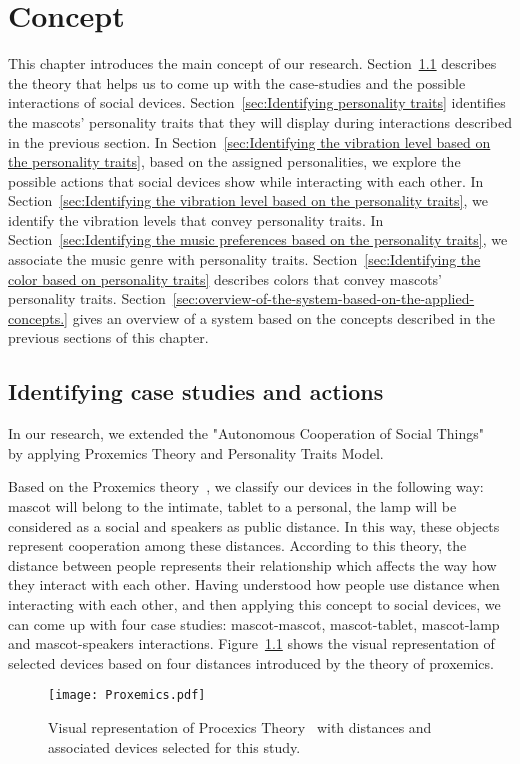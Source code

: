 \chapter{Concept}
\label{ch:concept}

This chapter introduces the main concept of our research.
Section~\ref{sec:Identifying case studies and actions} describes the theory that helps us
to come up with the case-studies and the possible interactions of social devices.
Section~\ref{sec:Identifying personality traits} identifies the mascots' personality traits
that they will display during interactions described in the previous section.
In Section~\ref{sec:Identifying the vibration level based on the personality traits},
based on the assigned personalities, we explore the possible actions
that social devices show while interacting with each other.
In Section~\ref{sec:Identifying the vibration level based on the personality traits},
we identify the vibration levels that convey personality traits.
In Section~\ref{sec:Identifying the music preferences based on the personality traits},
we associate the music genre with personality traits.
Section~\ref{sec:Identifying the color based on personality traits} describes
colors that convey mascots' personality traits.
Section~\ref{sec:overview-of-the-system-based-on-the-applied-concepts.} gives an overview of a system
based on the concepts described in the previous sections of this chapter.

\section{Identifying case studies and actions}
\label{sec:Identifying case studies and actions}

In our research, we extended the "Autonomous Cooperation of Social Things" ~\cite{okada2016autonomous}
by applying Proxemics Theory and Personality Traits Model.

Based on the Proxemics theory~\cite{hall1966hidden, hall1963system}, we classify our devices in the following way:
mascot will belong to the intimate, tablet to a personal, the
lamp will be considered as a social and speakers as public distance.
In this way, these objects represent cooperation among these distances.
According to this theory, the distance between people represents their
relationship which affects the way how they interact with each other.
Having understood how people use distance when interacting with each other,
and then applying this concept to social devices, we can come up with four case studies:
mascot-mascot, mascot-tablet, mascot-lamp and mascot-speakers interactions.
Figure~\ref{fig:Proxemics} shows the visual representation of selected devices based on
four distances introduced by the theory of proxemics.
\begin{figure}[hbt!]
    \centering
    \texttt{[image: Proxemics.pdf]}
    \caption{Visual representation of Procexics Theory~\cite{hall1966hidden, hall1963system} with distances and associated devices selected for
    this study.}
    \label{fig:Proxemics}
\end{figure}

